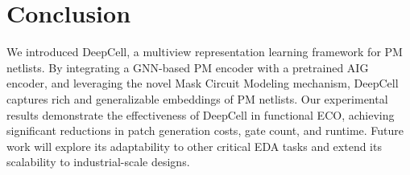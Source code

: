 \section{Conclusion}\label{Sec:Conclusion}
We introduced DeepCell, a multiview representation learning framework for PM netlists. By integrating a GNN-based PM encoder with a pretrained AIG encoder, and leveraging the novel Mask Circuit Modeling mechanism, DeepCell captures rich and generalizable embeddings of PM netlists. Our experimental results demonstrate the effectiveness of DeepCell in functional ECO, achieving significant reductions in patch generation costs, gate count, and runtime. Future work will explore its adaptability to other critical EDA tasks and extend its scalability to industrial-scale designs.

